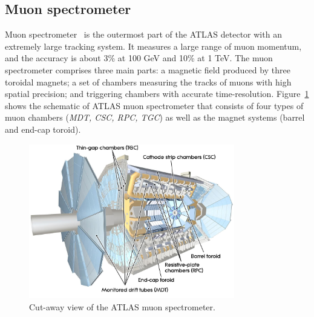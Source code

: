 \subsection{Muon spectrometer}

Muon spectrometer~\cite{CERN-LHCC-97-022} is the outermost part of the ATLAS detector with an extremely large tracking system.
It measures a large range of muon momentum, and the accuracy is about 3\% at 100 GeV and 10\% at 1 TeV.
The muon spectrometer comprises three main parts: a magnetic field produced by three toroidal magnets;
a set of chambers measuring the tracks of muons with high spatial precision; and triggering chambers with accurate time-resolution. 
Figure~\ref{fig:muon_dec} shows the schematic of ATLAS muon spectrometer that consists of four types of muon chambers 
(\textit{MDT, CSC, RPC, TGC}) as well as the magnet systems (barrel and end-cap toroid).
\begin{figure}[!htb]
  \centering
  \includegraphics[width=0.8\textwidth]{figures/Detector/muon_all.png}
  \caption{Cut-away view of the ATLAS muon spectrometer\cite{Sliwa:2013oua}.}
  \label{fig:muon_dec}
\end{figure}


